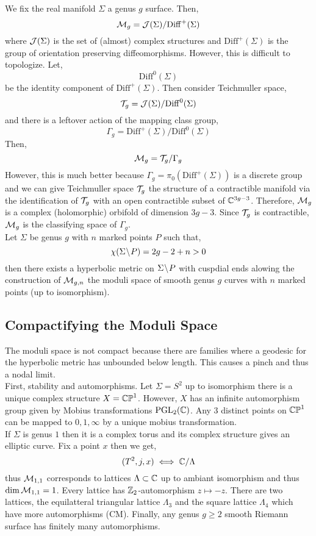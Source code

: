 \documentclass[12pt]{article}
\begin{document}
We fix the real manifold $\Sigma$ a genus $g$ surface. Then,
\[ \mathcal{M}_g = \mathcal{J}(\Sigma) / \mathrm{Diff}^+(\Sigma) \]
where $\mathcal{J}(\Sigma)$ is the set of (almost) complex structures and $\mathrm{Diff}^+(\Sigma)$ is the group of orientation preserving diffeomorphisms. However, this is difficult to topologize. Let,
\[ \mathrm{Diff}^0(\Sigma) \]
be the identity component of $\mathrm{Diff}^+(\Sigma)$. Then consider Teichmuller space,
\[ \mathcal{T}_g = \mathcal{J}(\Sigma) / \mathrm{Diff}^0(\Sigma) \]
and there is a leftover action of the mapping class group,
\[ \Gamma_g = \mathrm{Diff}^+(\Sigma) / \mathrm{Diff}^0(\Sigma) \]
Then,
\[ \mathcal{M}_g = \mathcal{T}_g / \Gamma_g \]
However, this is much better because $\Gamma_g = \pi_0(\mathrm{Diff}^+(\Sigma))$ is a discrete group and we can give Teichmuller space $\mathcal{T}_g$ the structure of a contractible manifold via the identification of $\mathcal{T}_g$ with an open contractible subset of $\mathbb{C}^{3g - 3}$. Therefore, $\mathcal{M}_g$ is a complex (holomorphic) orbifold of dimension $3g - 3$. Since $\mathcal{T}_g$ is contractible, $\mathcal{M}_g$ is the classifying space of $\Gamma_g$.
\bigskip\\
Let $\Sigma$ be genus $g$ with $n$ marked points $P$ such that,
\[ \chi(\Sigma \! \setminus \! P) = 2 g - 2 + n > 0 \]
then there exists a hyperbolic metric on $\Sigma \! \setminus \! P$ with cuspdial ends alowing the construction of $\mathcal{M}_{g,n}$ the moduli space of smooth genus $g$ curves with $n$ marked points (up to isomorphism). 

\subsection{Compactifying the Moduli Space}

\newcommand{\Mbar}{\overline{\mathcal{M}}}

The moduli space is not compact because there are families where a geodesic for the hyperbolic metric has unbounded below length. This causes a pinch and thus a nodal limit. 
\bigskip\\
First, stability and automorphisms. Let $\Sigma = S^2$ up to isomorphism there is a unique complex structure $X = \mathbb{CP}^1$. However, $X$ has an infinite automorphism group given by Mobius transformations $\mathrm{PGL}_2(\mathbb{C})$. 
Any $3$ distinct points on $\mathbb{CP}^1$ can be mapped to $0,1,\infty$ by a unique mobius transformation. 
\bigskip\\
If $\Sigma$ is genus $1$ then it is a complex torus and its complex structure gives an elliptic curve. Fix a point $x$ then we get,
\[ (T^2, j, x) \iff \mathbb{C} / \Lambda \]
thus $\mathcal{M}_{1,1}$ corresponds to lattices $\Lambda \subset \mathbb{C}$ up to ambiant isomorphism and thus $\dim{\mathcal{M}_{1,1}} = 1$. Every lattice has $\mathbb{Z}_2$-automorphism $z \mapsto -z$. There are two lattices, the equilatteral triangular lattice $\Lambda_3$ and the square lattice $\Lambda_4$ which have more automorphisms (CM). Finally, any genus $g \ge 2$ smooth Riemann surface has finitely many automorphisms.
\end{document}
